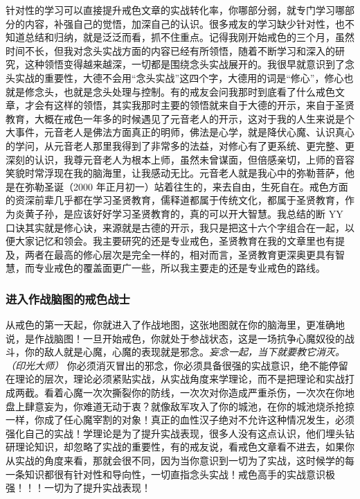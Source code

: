 针对性的学习可以直接提升戒色文章的实战转化率，你哪部分弱，就专门学习哪部分的内容，补强自己的觉悟，加深自己的认识。很多戒友的学习缺少针对性，也不知道总结和归纳，就是泛泛而看，抓不住重点。记得我刚开始戒色的三个月，虽然时间不长，但我对念头实战方面的内容已经有所领悟，随着不断学习和深入的研究，这种领悟变得越来越深，一切都是围绕念头实战展开的。我很早就意识到了念头实战的重要性，大德不会用“念头实战”这四个字，大德用的词是“修心”，修心也就是修念头，也就是念头处理与控制。有的戒友会问我那时到底看了什么戒色文章，才会有这样的领悟，其实我那时主要的领悟就来自于大德的开示，来自于圣贤教育，大概在戒色一年多的时候遇见了元音老人的开示，这对于我的人生来说是个大事件，元音老人是佛法方面真正的明师，佛法是心学，就是降伏心魔、认识真心的学问，从元音老人那里我得到了非常多的法益，对修心有了更系统、更完整、更深刻的认识，我尊元音老人为根本上师，虽然未曾谋面，但倍感亲切，上师的音容笑貌时常浮现在我的脑海里，让我感动无比。元音老人就是我心中的弥勒菩萨，他是在弥勒圣诞（2000 年正月初一）站着往生的，来去自由，生死自在。戒色方面的资深前辈几乎都在学习圣贤教育，儒释道都属于传统文化，都属于圣贤教育，作为炎黄子孙，是应该好好学习圣贤教育的，真的可以开大智慧。我总结的断 YY 口诀其实就是修心诀，来源就是古德的开示，我只是把这十六个字组合在一起，以便大家记忆和领会。我主要研究的还是专业戒色，圣贤教育在我的文章里也有提及，两者在最高的修心层次是完全一样的，相对而言，圣贤教育更深奥更具有智慧，而专业戒色的覆盖面更广一些，所以我主要走的还是专业戒色的路线。

\subsubsection{进入作战脑图的戒色战士}

从戒色的第一天起，你就进入了作战地图，这张地图就在你的脑海里，更准确地说，是作战脑图！一旦开始戒色，你就处于参战状态，这是一场抗争心魔奴役的战斗，你的敌人就是心魔，心魔的表现就是邪念。\textit{妄念一起，当下就要教它消灭。（印光大师）} 你必须消灭冒出的邪念，你必须具备很强的实战意识，绝不能停留在理论的层次，理论必须紧贴实战，从实战角度来学理论，而不是把理论和实战打成两截。看着心魔一次次撕裂你的防线，一次次对你造成严重杀伤，一次次在你地盘上肆意妄为，你难道无动于衷？就像敌军攻入了你的城池，在你的城池烧杀抢掠一样，你成了任心魔宰割的对象！真正的血性汉子绝对不允许这种情况发生，必须强化自己的实战！学理论是为了提升实战表现，很多人没有这点认识，他们埋头钻研理论知识，却忽略了实战的重要性，有的戒友说，看戒色文章看不进去，如果你从实战的角度来看，那就会很不同，因为当你意识到一切为了实战，这时候学的每一条知识都很有针对性和导向性，一切直指念头实战！戒色高手的实战意识极强！！！一切为了提升实战表现！


